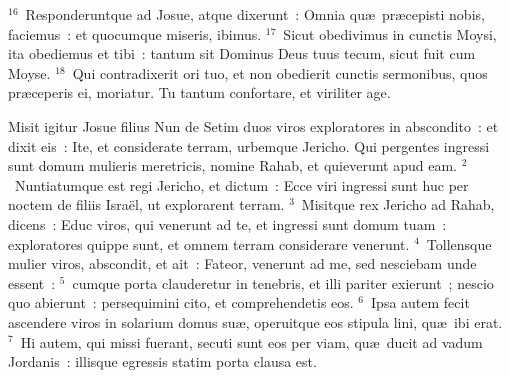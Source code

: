 ${}^{16}$~Responderuntque ad Josue, atque dixerunt~: Omnia qu\ae\ pr\ae cepisti nobis, faciemus~: et quocumque miseris, ibimus.
${}^{17}$~Sicut obedivimus in cunctis Moysi, ita obediemus et tibi~: tantum sit Dominus Deus tuus tecum, sicut fuit cum Moyse.
${}^{18}$~Qui contradixerit ori tuo, et non obedierit cunctis sermonibus, quos pr\ae ceperis ei, moriatur. Tu tantum confortare, et viriliter age.

\lettrine[lines=3,image=true,loversize=0.05,lraise=-0.03]{M}{}isit igitur Josue filius Nun de Setim duos viros exploratores in abscondito~: et dixit eis~: Ite, et considerate terram, urbemque Jericho. Qui pergentes ingressi sunt domum mulieris meretricis, nomine Rahab, et quieverunt apud eam.
${}^{2}$~Nuntiatumque est regi Jericho, et dictum~: Ecce viri ingressi sunt huc per noctem de filiis Isra\"el, ut explorarent terram.
${}^{3}$~Misitque rex Jericho ad Rahab, dicens~: Educ viros, qui venerunt ad te, et ingressi sunt domum tuam~: exploratores quippe sunt, et omnem terram considerare venerunt.
${}^{4}$~Tollensque mulier viros, abscondit, et ait~: Fateor, venerunt ad me, sed nesciebam unde essent~:
${}^{5}$~cumque porta clauderetur in tenebris, et illi pariter exierunt~; nescio quo abierunt~: persequimini cito, et comprehendetis eos.
${}^{6}$~Ipsa autem fecit ascendere viros in solarium domus su\ae , operuitque eos stipula lini, qu\ae\ ibi erat.
${}^{7}$~Hi autem, qui missi fuerant, secuti sunt eos per viam, qu\ae\ ducit ad vadum Jordanis~: illisque egressis statim porta clausa est.


